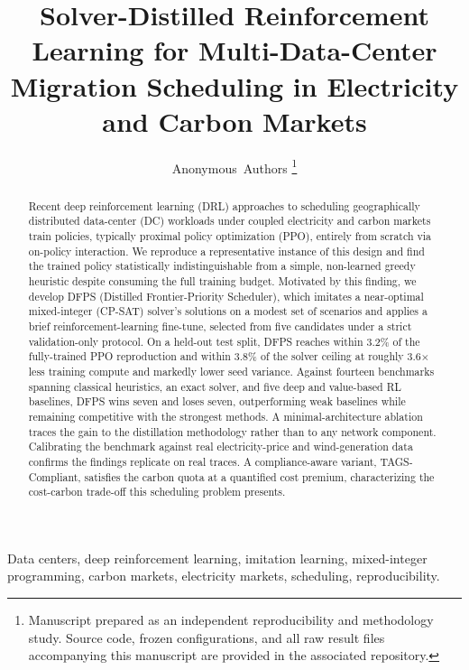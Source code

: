 \documentclass[journal]{IEEEtran}
\begin{document}
\title{Solver-Distilled Reinforcement Learning for Multi-Data-Center Migration Scheduling in Electricity and Carbon Markets}

\author{Anonymous~Authors
\thanks{Manuscript prepared as an independent reproducibility and methodology study. Source code, frozen configurations, and all raw result files accompanying this manuscript are provided in the associated repository.}}


\maketitle

\begin{abstract}
Recent deep reinforcement learning (DRL) approaches to scheduling geographically distributed data-center (DC) workloads under coupled electricity and carbon markets train policies, typically proximal policy optimization (PPO), entirely from scratch via on-policy interaction. We reproduce a representative instance of this design and find the trained policy statistically indistinguishable from a simple, non-learned greedy heuristic despite consuming the full training budget. Motivated by this finding, we develop DFPS (Distilled Frontier-Priority Scheduler), which imitates a near-optimal mixed-integer (CP-SAT) solver's solutions on a modest set of scenarios and applies a brief reinforcement-learning fine-tune, selected from five candidates under a strict validation-only protocol. On a held-out test split, DFPS reaches within 3.2\% of the fully-trained PPO reproduction and within 3.8\% of the solver ceiling at roughly 3.6$\times$ less training compute and markedly lower seed variance. Against fourteen benchmarks spanning classical heuristics, an exact solver, and five deep and value-based RL baselines, DFPS wins seven and loses seven, outperforming weak baselines while remaining competitive with the strongest methods. A minimal-architecture ablation traces the gain to the distillation methodology rather than to any network component. Calibrating the benchmark against real electricity-price and wind-generation data confirms the findings replicate on real traces. A compliance-aware variant, TAGS-Compliant, satisfies the carbon quota at a quantified cost premium, characterizing the cost-carbon trade-off this scheduling problem presents.
\end{abstract}

\begin{IEEEkeywords}
Data centers, deep reinforcement learning, imitation learning, mixed-integer programming, carbon markets, electricity markets, scheduling, reproducibility.
\end{IEEEkeywords}
\end{document}
